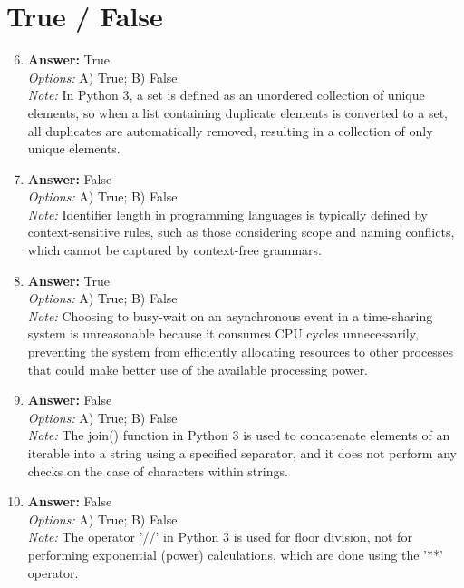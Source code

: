 \documentclass[12pt]{article}
\begin{document}
\section*{True / False}
\begin{enumerate}[label=\arabic*.]
\setcounter{enumi}{5}
\item \textbf{Answer:} True
\\ \textit{Options:} A) True; B) False
\\ \textit{Note:} In Python 3, a set is defined as an unordered collection of unique elements, so when a list containing duplicate elements is converted to a set, all duplicates are automatically removed, resulting in a collection of only unique elements.
\item \textbf{Answer:} False
\\ \textit{Options:} A) True; B) False
\\ \textit{Note:} Identifier length in programming languages is typically defined by context-sensitive rules, such as those considering scope and naming conflicts, which cannot be captured by context-free grammars.
\item \textbf{Answer:} True
\\ \textit{Options:} A) True; B) False
\\ \textit{Note:} Choosing to busy-wait on an asynchronous event in a time-sharing system is unreasonable because it consumes CPU cycles unnecessarily, preventing the system from efficiently allocating resources to other processes that could make better use of the available processing power.
\item \textbf{Answer:} False
\\ \textit{Options:} A) True; B) False
\\ \textit{Note:} The join() function in Python 3 is used to concatenate elements of an iterable into a string using a specified separator, and it does not perform any checks on the case of characters within strings.
\item \textbf{Answer:} False
\\ \textit{Options:} A) True; B) False
\\ \textit{Note:} The operator '//' in Python 3 is used for floor division, not for performing exponential (power) calculations, which are done using the '**' operator.
\end{enumerate}
\end{document}
